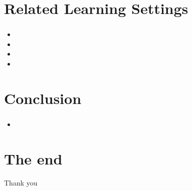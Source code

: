 \documentclass{beamer}
\begin{document}
\section{Related Learning Settings}

\begin{frame}
\frametitle{\insertsection}
\begin{itemize}
	\item 
	\item 
	\item 
	\item 
\end{itemize}
\end{frame}

\section{Conclusion}
\begin{frame}
\frametitle{\insertsection}
\begin{itemize}
	\item 
\end{itemize}
\end{frame}

\section{The end}
\begin{frame}
\Huge{\centerline{Thank you}}
\end{frame}
\end{document}
